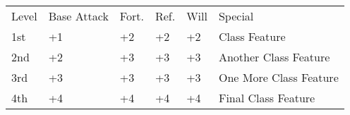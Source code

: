 \newcommand{\proficiencies}[1]{
  \ifx\verifya\verifyb\renewmdenv[hidealllines=true,backgroundcolor=gray!20]{abilitybox}\renewcommand{\verifya}{unverified}\else\renewcommand{\verifya}{verify}\renewmdenv[hidealllines=true,backgroundcolor=white]{abilitybox}\fi
\begin{abilitybox}\ability{Weapon and Armor Proficiencies:}{The \class is proficient with #1}\end{abilitybox}}

\newcommand{\classfeature}[2]{
  \ifx\verifya\verifyb\renewmdenv[hidealllines=true,backgroundcolor=gray!20]{abilitybox}\renewcommand{\verifya}{unverified}\else\renewcommand{\verifya}{verify}\renewmdenv[hidealllines=true,backgroundcolor=white]{abilitybox}\fi
  \begin{abilitybox}\ability{#1}{#2}\end{abilitybox}}

\newcommand{\startclasstable}{
  \ifx\verifya\verifyb\renewmdenv[hidealllines=true,backgroundcolor=gray!20]{abilitybox}\renewcommand{\verifya}{unverified}\else\renewcommand{\verifya}{verify}\renewmdenv[hidealllines=true,backgroundcolor=white]{abilitybox}\fi
  \begin{abilitybox}}
  
\newcommand{\stopclasstable}{\end{abilitybox}}

\vspace{-8pt}





\begin{table}[htb]
\centering
\begin{small}
\begin{tabular}{lp{.75in}p{0.275in}p{0.275in}p{0.275in}l}
\rowcolor{gray!50}
Level &Base Attack &Fort. &Ref. &Will &Special\\
\rowcolor{gray!40}
1st & +1 & +2 & +2 & +2 & Class Feature \\
\rowcolor{gray!20}
2nd & +2 & +3 & +3 & +3 & Another Class Feature \\
\rowcolor{gray!40}
3rd & +3 & +3 & +3 & +3 & One More Class Feature \\
\rowcolor{gray!20}
4th & +4 & +4 & +4 & +4 & Final Class Feature \\
\end{tabular}
\end{small}
\end{table}

